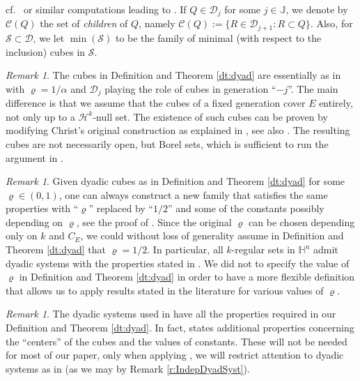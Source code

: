 \documentclass[12pt]{amsart}
\numberwithin{equation}{section}
\theoremstyle{plain}
\theoremstyle{definition}
\theoremstyle{remark}
\newtheorem{remark}[theorem]{Remark}
\begin{document}
    cf.\ \cite[(14)]{Hahlomaa} or similar computations leading to \cite[(2.8)]{FV1}.
If $Q\in\mathcal D_j$ for some $j\in\mathbb J$, we denote by $\mathcal C(Q)$ the set of \textit{children} of $Q$, namely $\mathcal C(Q):=\{R\in \mathcal D_{j+1}: R\subset Q\}$. 
 Also, for $\mathcal S\subset \mathcal D$, we let $\min(\mathcal S)$ to be the family of minimal (with respect to the inclusion) cubes in $\mathcal S$.
\begin{remark}\label{r:Dyad1}
The cubes in Definition and Theorem \ref{dt:dyad} are essentially as in \cite[(8)--(14)]{Hahlomaa} with $\varrho = 1/\alpha$ and  $\mathcal{D}_j$ playing the role of cubes in generation ``$-j$''.   
The main difference is that we assume that the cubes of a fixed generation cover $E$ entirely, not only up to a $\mathcal{H}^k$-null set. The existence of such cubes can be proven by modifying Christ's original construction as explained in \cite[Section 4]{MR2965363}, see also \cite[Lemma 2.6.1]{Bate}. The resulting cubes are not necessarily open, but  Borel sets, which is sufficient to run the argument in  \cite{Hahlomaa}.
\end{remark}

\begin{remark}\label{r:Dyad2}
Given dyadic cubes as in Definition and Theorem \ref{dt:dyad} for some $\varrho\in (0,1)$, one can always construct a new family that satisfies the same properties with ``$\varrho$'' replaced by ``$1/2$'' and some of the constants possibly depending on $\varrho$, see the proof of \cite[Proposition 2.12]{MR3589162}. Since the original $\varrho$ can be chosen depending only on $k$ and $C_E$, we could without loss of generality assume in Definition and Theorem \ref{dt:dyad}  that $\varrho=1/2$. In particular, all $k$-regular sets in $\mathbb{H}^n$ admit dyadic systems with the properties stated in \cite[Theorem and Definition 2.5]{FV1}.
We did not to specify the value of $\varrho$ in Definition and Theorem \ref{dt:dyad} in order to have a more flexible definition that allows us to apply results stated in the literature for various values of $\varrho$.
\end{remark}

\begin{remark}\label{r:Dyad3}
The dyadic systems used in \cite{Bate} have all the properties required in our Definition and Theorem \ref{dt:dyad}. In fact,
\cite[Lemma 2.6.1]{Bate} states additional properties concerning the ``centers'' of the cubes and the values of constants. These will not be needed for most of our paper, only when applying  \cite[Theorem 9.0.1]{Bate}, we will restrict attention to dyadic systems as in \cite[Lemma 2.6.1]{Bate} (as we may by Remark \ref{r:IndepDyadSyst}).
\end{remark}
\end{document}
